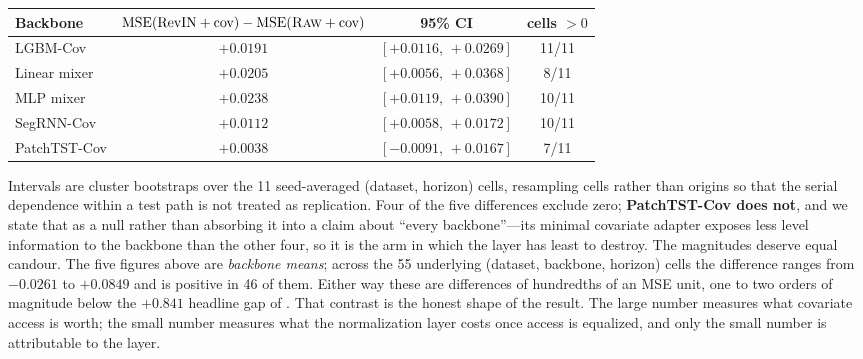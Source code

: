 \begin{center}
\small
\begin{tabular}{lccc}
\toprule
Backbone & $\mathrm{MSE}(\text{RevIN}+\text{cov}) - \mathrm{MSE}(\textsc{Raw}+\text{cov})$ & 95\% CI & cells $>0$ \\
\midrule
LGBM-Cov      & $+0.0191$ & $[+0.0116,\, +0.0269]$ & 11/11 \\
Linear mixer  & $+0.0205$ & $[+0.0056,\, +0.0368]$ & 8/11 \\
MLP mixer     & $+0.0238$ & $[+0.0119,\, +0.0390]$ & 10/11 \\
SegRNN-Cov    & $+0.0112$ & $[+0.0058,\, +0.0172]$ & 10/11 \\
PatchTST-Cov  & $+0.0038$ & $[-0.0091,\, +0.0167]$ & 7/11 \\
\bottomrule
\end{tabular}
\end{center}

\noindent Intervals are cluster bootstraps over the 11 seed-averaged (dataset, horizon) cells, resampling cells rather than origins so that the serial dependence within a test path is not treated as replication. Four of the five differences exclude zero; \textbf{PatchTST-Cov does not}, and we state that as a null rather than absorbing it into a claim about ``every backbone''---its minimal covariate adapter exposes less level information to the backbone than the other four, so it is the arm in which the layer has least to destroy. The magnitudes deserve equal candour. The five figures above are \emph{backbone means}; across the 55 underlying (dataset, backbone, horizon) cells the difference ranges from $-0.0261$ to $+0.0849$ and is positive in 46 of them. Either way these are differences of hundredths of an MSE unit, one to two orders of magnitude below the $+0.841$ headline gap of . That contrast is the honest shape of the result. The large number measures what covariate access is worth; the small number measures what the normalization layer costs once access is equalized, and only the small number is attributable to the layer.

